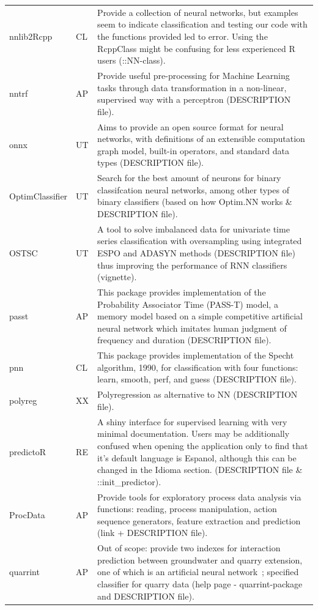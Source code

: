 \begin{Schunk}
\begin{longtable}[t]{ll>{\raggedright\arraybackslash}p{10cm}}
nnlib2Rcpp & CL & Provide a collection of neural networks, but examples seem to indicate classification and testing our code with the functions provided led to error. Using the RcppClass might be confusing for less experienced R users (::NN-class).\\
nntrf & AP & Provide useful pre-processing for Machine Learning tasks through data transformation in a non-linear, supervised way with a perceptron (DESCRIPTION file).\\
onnx & UT & Aims to provide an open source format for neural networks, with definitions of an extensible computation graph model, built-in operators, and standard data types (DESCRIPTION file).\\
\addlinespace
OptimClassifier & UT & Search for the best amount of neurons for binary classifcation neural networks, among other types of binary classifiers (based on how Optim.NN works \& DESCRIPTION file).\\
OSTSC & UT & A tool to solve imbalanced data for univariate time series classification with oversampling using integrated ESPO and ADASYN methods (DESCRIPTION file) thus improving the performance of RNN classifiers (vignette).\\
passt & AP & This package provides implementation of the Probability Associator Time (PASS-T) model, a memory model based on a simple competitive artificial neural network which imitates human judgment of frequency and duration (DESCRIPTION file).\\
pnn & CL & This package provides implementation of the Specht algorithm, 1990, for classification with four functions: learn, smooth, perf, and guess (DESCRIPTION file).\\
polyreg & XX & Polyregression as alternative to NN (DESCRIPTION file).\\
\addlinespace
predictoR & RE & A shiny interface for supervised learning with very minimal documentation. Users may be additionally confused when opening the application only to find that it's default language is Espanol, although this can be changed in the Idioma section. (DESCRIPTION file \& ::init\_predictor).\\
ProcData & AP & Provide tools for exploratory process data analysis via functions: reading, process manipulation, action sequence generators, feature extraction and prediction (link + DESCRIPTION file).\\
quarrint & AP & Out of scope: provide two indexes for interaction prediction between groundwater and quarry extension, one of which is an artificial neural network ; specified classifier for quarry data (help page - quarrint-package and DESCRIPTION file).\\

\end{longtable}
\end{Schunk}
